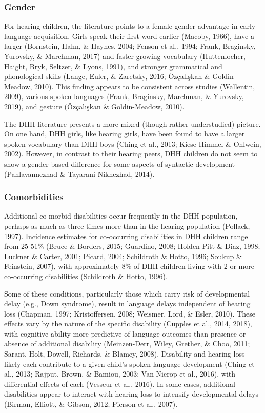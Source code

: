 \documentclass[
  english,
  man]{apa6}
\begin{document}
\hypertarget{gender}{%
\subsubsection{Gender}\label{gender}}

For hearing children, the literature points to a female gender advantage in early language acquisition. Girls speak their first word earlier (Macoby, 1966), have a larger (Bornstein, Hahn, \& Haynes, 2004; Fenson et al., 1994; Frank, Braginsky, Yurovsky, \& Marchman, 2017) and faster-growing vocabulary (Huttenlocher, Haight, Bryk, Seltzer, \& Lyons, 1991), and stronger grammatical and phonological skills (Lange, Euler, \& Zaretsky, 2016; Özçalışkan \& Goldin-Meadow, 2010). This finding appears to be consistent across studies (Wallentin, 2009), various spoken languages (Frank, Braginsky, Marchman, \& Yurovsky, 2019), and gesture (Özçalışkan \& Goldin-Meadow, 2010).

The DHH literature presents a more mixed (though rather understudied) picture. On one hand, DHH girls, like hearing girls, have been found to have a larger spoken vocabulary than DHH boys (Ching et al., 2013; Kiese-Himmel \& Ohlwein, 2002). However, in contrast to their hearing peers, DHH children do not seem to show a gender-based difference for some aspects of syntactic development (Pahlavannezhad \& Tayarani Niknezhad, 2014).

\hypertarget{comorbidities}{%
\subsubsection{Comorbidities}\label{comorbidities}}

Additional co-morbid disabilities occur frequently in the DHH population, perhaps as much as three times more than in the hearing population (Pollack, 1997). Incidence estimates for co-occurring disabilities in DHH children range from 25-51\% (Bruce \& Borders, 2015; Guardino, 2008; Holden-Pitt \& Diaz, 1998; Luckner \& Carter, 2001; Picard, 2004; Schildroth \& Hotto, 1996; Soukup \& Feinstein, 2007), with approximately 8\% of DHH children living with 2 or more co-occurring disabilities (Schildroth \& Hotto, 1996).

Some of these conditions, particularly those which carry risk of developmental delay (e.g., Down syndrome), result in language delays independent of hearing loss (Chapman, 1997; Kristoffersen, 2008; Weismer, Lord, \& Esler, 2010). These effects vary by the nature of the specific disability (Cupples et al., 2014, 2018), with cognitive ability more predictive of language outcomes than presence or absence of additional disability (Meinzen-Derr, Wiley, Grether, \& Choo, 2011; Sarant, Holt, Dowell, Richards, \& Blamey, 2008). Disability and hearing loss likely each contribute to a given child's spoken language development (Ching et al., 2013; Rajput, Brown, \& Bamiou, 2003; Van Nierop et al., 2016), with differential effects of each (Vesseur et al., 2016). In some cases, additional disabilities appear to interact with hearing loss to intensify developmental delays (Birman, Elliott, \& Gibson, 2012; Pierson et al., 2007).
\end{document}

